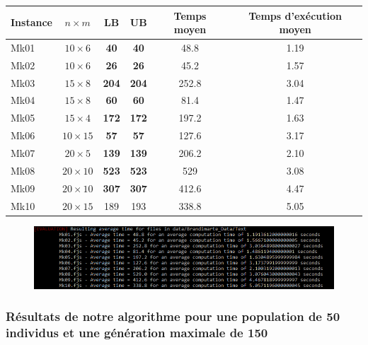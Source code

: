 \begin{table}[!h]
    \renewcommand{\arraystretch}{1.5}
    \centering
    \begin{tabular}{p{} c c c c c}
        Instance & $n \times m$ & LB & UB & Temps moyen & Temps d'exécution moyen \\
         \hline
        Mk01 & $10 \times 6$ & \textbf{40} & \textbf{40} & 48.8 & 1.19 \\
         \hline
        Mk02 & $10 \times 6$ & \textbf{26} & \textbf{26} & 45.2 & 1.57 \\
         \hline
        Mk03 & $15 \times 8$ & \textbf{204} & \textbf{204} & 252.8 & 3.04 \\
         \hline
        Mk04 & $15 \times 8$ & \textbf{60} & \textbf{60} & 81.4 & 1.47 \\
         \hline
        Mk05 & $15 \times 4$ & \textbf{172} & \textbf{172} & 197.2 & 1.63 \\
         \hline
        Mk06 & $10 \times 15$ & \textbf{57} & \textbf{57} & 127.6 & 3.17 \\
         \hline
        Mk07 & $20 \times 5$ & \textbf{139} & \textbf{139} & 206.2 & 2.10 \\
         \hline
        Mk08 & $20 \times 10$ & \textbf{523} & \textbf{523} & 529 & 3.08 \\
         \hline
        Mk09 & $20 \times 10$ & \textbf{307} & \textbf{307} & 412.6 & 4.47 \\
         \hline
        Mk10 & $20 \times 15$ & 189 & 193 & 338.8 & 5.05 \\
         \hline 
    \end{tabular}
\end{table}

\begin{figure}[!h]
    \centering
    \includegraphics[width=\linewidth]{report/Pictures/brandimarte_10_100.png}
\end{figure}

\subsubsection{Résultats de notre algorithme pour une population de 50 individus et une génération maximale de 150}

